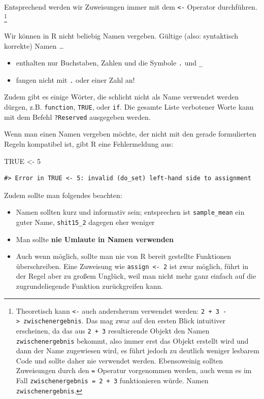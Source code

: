 \documentclass[]{tufte-book}
\newenvironment{Shaded}{}{}
\newcommand{\DecValTok}[1]{\textcolor[rgb]{0.25,0.63,0.44}{#1}}
\newcommand{\StringTok}[1]{\textcolor[rgb]{0.25,0.44,0.63}{#1}}
\newcommand{\OtherTok}[1]{\textcolor[rgb]{0.00,0.44,0.13}{#1}}
\newcommand{\NormalTok}[1]{#1}
\providecommand{\tightlist}{%
  \setlength{\itemsep}{0pt}\setlength{\parskip}{0pt}}
\begin{document}
Entsprechend werden wir Zuweisungen immer mit dem \texttt{\textless{}-}
Operator durchführen. \footnote{Theoretisch kann \texttt{\textless{}-}
  auch andersherum verwendet werden:
  \texttt{2\ +\ 3\ -\textgreater{}\ zwischenergebnis}. Das mag zwar auf
  den ersten Blick intuitiver erscheinen, da das aus \texttt{2\ +\ 3}
  resultierende Objekt den Namen \texttt{zwischenergebnis} bekommt, also
  immer erst das Objekt erstellt wird und dann der Name zugewiesen wird,
  es führt jedoch zu deutlich weniger lesbarem Code und sollte daher nie
  verwendet werden. Ebensoweinig sollten Zuweisungen durch den
  \texttt{=} Operatur vorgenommen werden, auch wenn es im Fall
  \texttt{zwischenergebnis\ =\ 2\ +\ 3} funktionieren würde. Namen
  \texttt{zwischenergebnis}.}

Wir können in R nicht beliebig Namen vergeben. Gültige (also:
syntaktisch korrekte) Namen \ldots{}

\begin{itemize}
\tightlist
\item
  enthalten nur Buchstaben, Zahlen und die Symbole \texttt{.} und
  \texttt{\_}
\item
  fangen nicht mit \texttt{.} oder einer Zahl an!
\end{itemize}

Zudem gibt es einige Wörter, die schlicht nicht als Name verwendet
werden dürgen, z.B. \texttt{function}, \texttt{TRUE}, oder \texttt{if}.
Die gesamte Liste verbotener Worte kann mit dem Befehl
\texttt{?Reserved} ausgegeben werden.

Wenn man einen Namen vergeben möchte, der nicht mit den gerade
formulierten Regeln kompatibel ist, gibt R eine Fehlermeldung aus:

\begin{Shaded}
\begin{Highlighting}[]
\OtherTok{TRUE}\NormalTok{ <-}\StringTok{ }\DecValTok{5}
\end{Highlighting}
\end{Shaded}

\begin{verbatim}
#> Error in TRUE <- 5: invalid (do_set) left-hand side to assignment
\end{verbatim}

Zudem sollte man folgendes beachten:

\begin{itemize}
\tightlist
\item
  Namen sollten kurz und informativ sein; entsprechen ist
  \texttt{sample\_mean} ein guter Name, \texttt{shit15\_2} dagegen eher
  weniger
\item
  Man sollte \textbf{nie Umlaute in Namen verwenden}
\item
  Auch wenn möglich, sollte man nie von R bereit gestellte Funktionen
  überschreiben. Eine Zuweisung wie \texttt{assign\ \textless{}-\ 2} ist
  zwar möglich, führt in der Regel aber zu großem Unglück, weil man
  nicht mehr ganz einfach auf die zugrundeliegende Funktion
  zurückgreifen kann.
\end{itemize}
\end{document}
